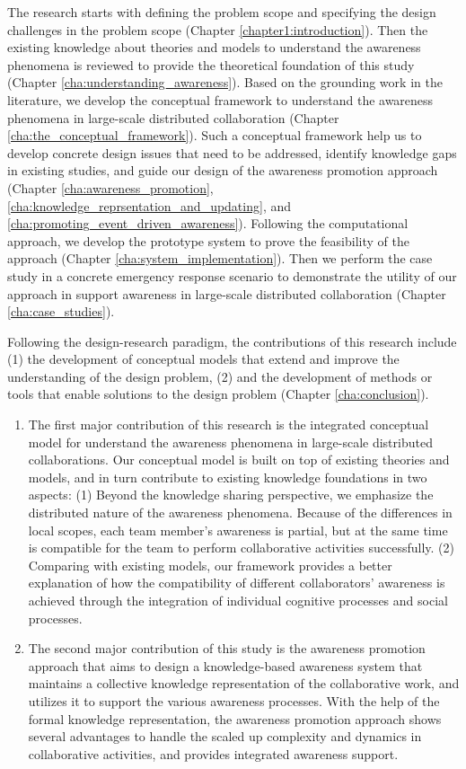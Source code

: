 The research starts with defining the problem scope and specifying the design challenges in the problem scope (Chapter \ref{chapter1:introduction}). Then the existing knowledge about theories and models to understand the awareness phenomena is reviewed to provide the theoretical foundation of this study (Chapter \ref{cha:understanding_awareness}). Based on the grounding work in the literature, we develop the conceptual framework to understand the awareness phenomena in large-scale distributed collaboration (Chapter \ref{cha:the_conceptual_framework}). Such a conceptual framework help us to develop concrete design issues that need to be addressed, identify knowledge gaps in existing studies, and guide our design of the awareness promotion approach (Chapter \ref{cha:awareness_promotion}, \ref{cha:knowledge_reprsentation_and_updating}, and \ref{cha:promoting_event_driven_awareness}). Following the computational approach, we develop the prototype system to prove the feasibility of the approach (Chapter \ref{cha:system_implementation}). Then we perform the case study in a concrete emergency response scenario to demonstrate the utility of our approach in support awareness in large-scale distributed collaboration (Chapter \ref{cha:case_studies}). 

Following the design-research paradigm, the contributions of this research include (1) the development of conceptual models that extend and improve the understanding of the design problem, (2) and the development of methods or tools that enable solutions to the design problem (Chapter \ref{cha:conclusion}).

\begin{enumerate}
	\item The first major contribution of this research is the integrated conceptual model for understand the awareness phenomena in large-scale distributed collaborations. Our conceptual model is built on top of existing theories and models, and in turn contribute to existing knowledge foundations in two aspects: (1) Beyond the knowledge sharing perspective, we emphasize the distributed nature of the awareness phenomena. Because of the differences in local scopes, each team member’s awareness is partial, but at the same time is compatible for the team to perform collaborative activities successfully. (2) Comparing with existing models, our framework provides a better explanation of how the compatibility of different collaborators’ awareness is achieved through the integration of individual cognitive processes and social processes.
	\item The second major contribution of this study is the awareness promotion approach that aims to design a knowledge-based awareness system that maintains a collective knowledge representation of the collaborative work, and utilizes it to support the various awareness processes. With the help of the formal knowledge representation, the awareness promotion approach shows several advantages to handle the scaled up complexity and dynamics in collaborative activities, and provides integrated awareness support.
\end{enumerate}
